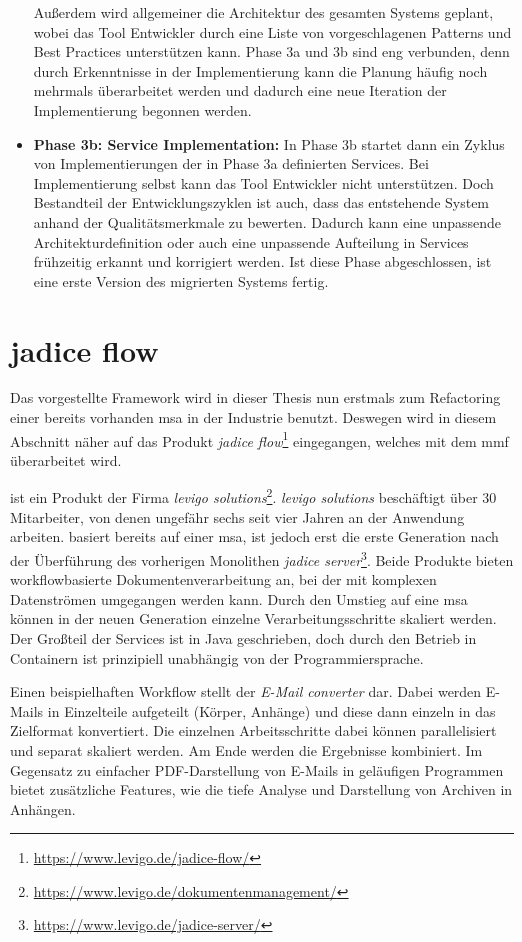 \begin{itemize}
	Außerdem wird allgemeiner die Architektur des gesamten Systems geplant, wobei das Tool Entwickler durch eine Liste von vorgeschlagenen Patterns und Best Practices unterstützen kann.
	 Phase 3a und 3b sind eng verbunden, denn durch Erkenntnisse in der Implementierung kann die Planung häufig noch mehrmals überarbeitet werden und dadurch eine neue Iteration der Implementierung begonnen werden.
	\item \textbf{Phase 3b: Service Implementation:} In Phase 3b startet dann ein Zyklus von Im\-ple\-men\-tie\-rung\-en der in Phase 3a definierten Services.
	Bei Implementierung selbst kann das Tool Entwickler nicht unterstützen.
	Doch Bestandteil der Entwicklungszyklen ist auch, dass das entstehende System anhand der Qualitätsmerkmale zu bewerten.
	Dadurch kann eine unpassende Architekturdefinition oder auch eine unpassende Aufteilung in Services frühzeitig erkannt und korrigiert werden.
	Ist diese Phase abgeschlossen, ist eine erste Version des migrierten Systems fertig.
\end{itemize}

\section{jadice flow}

Das vorgestellte Framework wird in dieser Thesis nun erstmals zum Refactoring einer bereits vorhanden \acrlong{msa} in der Industrie benutzt.
Deswegen wird in diesem Abschnitt näher auf das Produkt \emph{jadice flow}\footnote{\url{https://www.levigo.de/jadice-flow/}} eingegangen, welches mit dem \gls{mmf} überarbeitet wird.

\jf ist ein Produkt der Firma \emph{levigo solutions}\footnote{\url{https://www.levigo.de/dokumentenmanagement/}}.
\emph{levigo solutions} beschäftigt über 30 Mitarbeiter, von denen ungefähr sechs seit vier Jahren an der Anwendung arbeiten.
\jf basiert bereits auf einer \acrlong{msa}, ist jedoch erst die erste Generation nach der Überführung des vorherigen Monolithen \emph{jadice server}\footnote{\url{https://www.levigo.de/jadice-server/}}.
Beide Produkte bieten workflowbasierte Dokumentenverarbeitung an, bei der mit komplexen Datenströmen umgegangen werden kann.
Durch den Umstieg auf eine \acrlong{msa} können in der neuen Generation einzelne Verarbeitungsschritte skaliert werden.
Der Großteil der Services ist in Java geschrieben, doch durch den Betrieb in Containern ist \jf prinzipiell unabhängig von der Programmiersprache.

Einen beispielhaften Workflow stellt der \emph{E-Mail converter} dar.
Dabei werden E-Mails in Einzelteile aufgeteilt (Körper, Anhänge) und diese dann einzeln in das Zielformat konvertiert.
Die einzelnen Arbeitsschritte dabei können parallelisiert und separat skaliert werden.
Am Ende werden die Ergebnisse kombiniert.
Im Gegensatz zu einfacher PDF-Darstellung von E-Mails in geläufigen Programmen bietet \jf zusätzliche Features, wie die tiefe Analyse und Darstellung von Archiven in Anhängen.

